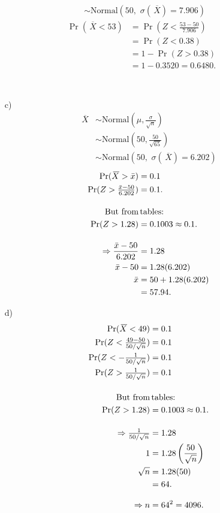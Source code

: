 \documentclass[12pt]{article}
\begin{document}
{\begin{minipage}[t]{0.98\textwidth}
\begin{minipage}[t]{0.47\textwidth}
\begin{enumerate}[a)]
\begin{align*}
&\sim \text{Normal}\left(50,\,\,\sigma(\,\overline{\!X}) =7.906\right)
\end{align*}
\begin{align*}
\Pr(\,\overline{\!X}<53) &= \Pr(Z < \tfrac{53-50}{7.906})\\
&= \Pr(Z < 0.38) \\
&= 1-\Pr(Z > 0.38)\\
&= 1-0.3520 = 0.6480.
\end{align*}
\end{enumerate}
\end{minipage}\hspace{0.04\textwidth}
\begin{minipage}[t]{0.47\textwidth}
\quad\\[-1cm]
\begin{enumerate}
\item[c)] \quad\\[-1.45cm]
\begin{align*}
\,\overline{\!X}&\sim \text{Normal}\left(\mu,\frac{\sigma}{\sqrt{n}}\right)\\
&\sim \text{Normal}\left(50,\frac{50}{\sqrt{65}}\right)\\
&\sim \text{Normal}\left(50,\,\,\sigma(\,\overline{\!X}) =6.202\right)
\end{align*}
\begin{align*}
\Pr(\,\overline{\!X}>\bar x) &= 0.1\\
\Pr(Z > \tfrac{\bar x -50}{6.202}) &= 0.1.\\[0.4cm]
\text{But from} & \text{\,tables:}\\
\Pr(Z > 1.28) &= 0.1003 \approx 0.1.\\[0.4cm]
\Rightarrow \frac{\bar x -50}{6.202} &= 1.28\\
\bar x -50 &= 1.28(6.202)\\
\bar x  &= 50 +  1.28(6.202)\\
&=57.94.
\end{align*}
\item[d)] \quad\\[-1.45cm]
\begin{align*}
\Pr(\,\overline{\!X} < 49) &= 0.1\\
\Pr(Z < \tfrac{49 -50}{50/\sqrt{n}}) &= 0.1\\
\Pr(Z < -\tfrac{1}{50/\sqrt{n}}) &= 0.1\\
\Pr(Z > \tfrac{1}{50/\sqrt{n}}) &= 0.1\\[0.4cm]
\text{But from} & \text{\,tables:}\\
\Pr(Z > 1.28) &= 0.1003 \approx 0.1.\\[0.4cm]
\Rightarrow \tfrac{1}{50/\sqrt{n}} &= 1.28\\
1 &= 1.28\left(\frac{50}{\sqrt{n}}\right)\\
\sqrt{n} &= 1.28(50)\\
&= 64.\\[0.3cm]
\Rightarrow n &= 64^2 = 4096.
\end{align*}
\end{enumerate}
\end{minipage}
\end{minipage}}\vspace{0.03\textwidth}
\end{document}
